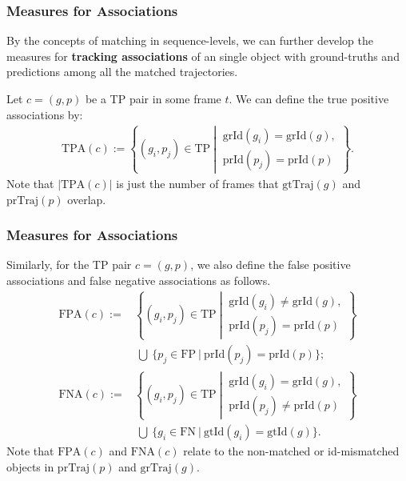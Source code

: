 \documentclass[slidestop, mathserif]{beamer}
\begin{document}
\begin{frame}
    \frametitle{Measures for Associations}

    By the concepts of matching in sequence-levels, we can further develop the
    measures for {\bf tracking associations} of an single object with ground-truths
    and predictions among all the matched trajectories.

    \quad 

    Let $c = (g,p)$ be a TP pair in some frame $t$. We can define the true positive
    associations by:
    \begin{align*}
        \text{TPA}(c) := 
            \left\{(g_i, p_j)\in\text{TP}\ \left|\ 
            \begin{array}{c}
                \text{grId}(g_i)=\text{grId}(g), \\
                \text{prId}(p_j) = \text{prId}(p)
            \end{array}\right.
            \right\}.
    \end{align*}
    Note that $|\text{TPA}(c)|$ is just the number of frames that $\text{gtTraj}(g)$
    and $\text{prTraj}(p)$ overlap.

\end{frame}

\begin{frame}
    \frametitle{Measures for Associations}

    Similarly, for the TP pair $c = (g, p)$, we also define the false positive associations
    and false negative associations as follows.
    \begin{align*}
        \text{FPA}(c) := &
            \left\{(g_i, p_j)\in\text{TP}\ \left|\ 
            \begin{array}{c}
                \text{grId}(g_i) \neq \text{grId}(g), \\
                \text{prId}(p_j) = \text{prId}(p)
            \end{array}\right.
            \right\} \\
            & ~ \bigcup ~
            \Big\{p_j\in\text{FP}\ |\ 
                \text{prId}(p_j) = \text{prId}(p)
            \Big\}; \\
        \text{FNA}(c) := &
            \left\{(g_i, p_j)\in\text{TP}\ \left|\ 
            \begin{array}{c}
                \text{grId}(g_i) = \text{grId}(g), \\
                \text{prId}(p_j) \neq \text{prId}(p)
            \end{array}\right.
            \right\} \\
            & ~ \bigcup ~
            \Big\{g_i\in\text{FN}\ |\ 
                \text{gtId}(g_i) = \text{gtId}(g)
            \Big\}.
    \end{align*}
    Note that $\text{FPA}(c)$ and $\text{FNA}(c)$ relate to the non-matched or id-mismatched
    objects in $\text{prTraj}(p)$ and $\text{grTraj}(g)$.

\end{frame}
\end{document}

